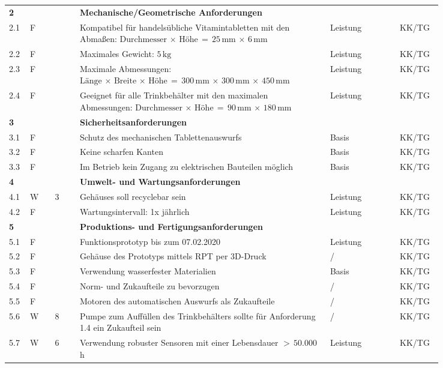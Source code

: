 \begin{longtable}{C{0.03\linewidth}C{0.05\linewidth}C{0.05\linewidth}L{0.5\linewidth}C{0.14\linewidth}C{0.07\linewidth}}
	\midrule
	
	\textbf{2} & & & \textbf{Mechanische/Geometrische Anforderungen} &&\\
	2.1 & F & & Kompatibel für handelsübliche Vitamintabletten mit den Abmaßen: $\text{Durchmesser}\,\times\,\text{Höhe}\,=\,25\,\text{mm}\,\times\,6\,\text{mm}$ & Leistung  & KK/TG\\
	2.2 & F & & Maximales Gewicht: $5\,\text{kg}$ & Leistung & KK/TG\\
	2.3 & F & & Maximale Abmessungen: $\text{Länge}\,\times\,\text{Breite}\,\times\,\text{Höhe}\,=\,300\,\text{mm}\,\times\,300\,\text{mm}\,\times\,450\,\text{mm}$ & Leistung  & KK/TG\\
	2.4 & F & & Geeignet für alle Trinkbehälter mit den maximalen Abmessungen: $\text{Durchmesser}\,\times\,\text{Höhe}\,=\,90\,\text{mm}\,\times\,180\,\text{mm}$ & Leistung & KK/TG\\
	
	\midrule
	
	\textbf{3} & & & \textbf{Sicherheitsanforderungen} &&\\
	3.1 & F & & Schutz des mechanischen Tablettenauswurfs & Basis & KK/TG\\
	3.2 & F & & Keine scharfen Kanten & Basis & KK/TG\\
	3.3 & F & & Im Betrieb kein Zugang zu elektrischen Bauteilen möglich & Basis & KK/TG\\
	
	\midrule 
	
	\textbf{4} & & & \textbf{Umwelt- und Wartungsanforderungen} &&\\
	4.1 & W & 3 & Gehäuses soll recyclebar sein & Leistung & KK/TG\\
	4.2 & F & & Wartungsintervall: 1x jährlich & Leistung & KK/TG\\
	
	\midrule
	
	\textbf{5} & & & \textbf{Produktions- und Fertigungsanforderungen}&& \\
	5.1 & F & & Funktionsprototyp bis zum 07.02.2020 & Leistung & KK/TG\\
	5.2 & F & & Gehäuse des Prototyps mittels RPT per 3D-Druck & / & KK/TG\\
	5.3 & F & & Verwendung wasserfester Materialien &Basis& KK/TG\\
	5.4 & F & & Norm- und Zukaufteile zu bevorzugen & / & KK/TG\\
	5.5 & F & & Motoren des automatischen Auswurfs als Zukaufteile & / & KK/TG\\
	5.6 & W & 8 & Pumpe zum Auffüllen des Trinkbehälters sollte für Anforderung 1.4 ein Zukaufteil sein & / & KK/TG\\
	5.7 & W & 6 & Verwendung robuster Sensoren mit einer Lebensdauer $>\, 50.000\,$h & Leistung & KK/TG\\
	

\end{longtable}
